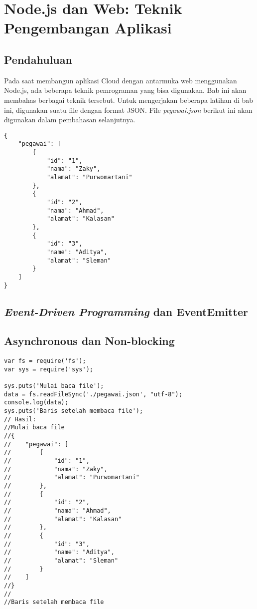 \chapter{Node.js dan Web: Teknik Pengembangan Aplikasi}

\section{Pendahuluan}

Pada saat membangun aplikasi Cloud dengan antarmuka web menggunakan Node.js, ada beberapa teknik pemrograman yang bisa digunakan. Bab ini akan membahas berbagai teknik tersebut. Untuk mengerjakan beberapa latihan di bab ini, digunakan suatu file dengan format JSON. File \textit{pegawai.json} berikut ini akan digunakan dalam pembahasan selanjutnya.

\lstset{language=JavaScript,caption=pegawai.json}
\begin{lstlisting}
{
    "pegawai": [
        {
            "id": "1",
            "nama": "Zaky",
            "alamat": "Purwomartani"
        },
        {
            "id": "2",
            "nama": "Ahmad",
            "alamat": "Kalasan"
        },
        {
            "id": "3",
            "name": "Aditya",
            "alamat": "Sleman"
        }
    ]
}
\end{lstlisting}

\section{\textit{Event-Driven Programming} dan EventEmitter}

\section{Asynchronous dan Non-blocking}

\lstset{language=JavaScript,caption=Membaca file secara synchronous}
\begin{lstlisting}
var fs = require('fs');
var sys = require('sys');

sys.puts('Mulai baca file');
data = fs.readFileSync('./pegawai.json', "utf-8");
console.log(data);
sys.puts('Baris setelah membaca file');
// Hasil:
//Mulai baca file
//{
//    "pegawai": [
//        {
//            "id": "1",
//            "nama": "Zaky",
//            "alamat": "Purwomartani"
//        },
//        {
//            "id": "2",
//            "nama": "Ahmad",
//            "alamat": "Kalasan"
//        },
//        {
//            "id": "3",
//            "name": "Aditya",
//            "alamat": "Sleman"
//        }
//    ]
//}
//
//Baris setelah membaca file
\end{lstlisting}

